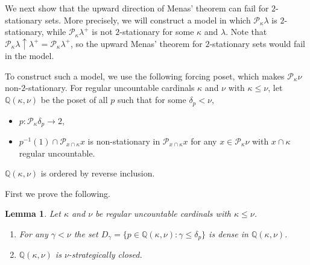 \documentclass[a4paper,12pt,reqno,oneside]{amsart}
\theoremstyle{plain}
\newtheorem{lemma}[theorem]{Lemma}
\newcommand{\mbb}{\mathbb}
\newcommand{\mcal}{\mathcal}
\begin{document}

We next show that the upward direction of Menas' theorem can fail for $2$-stationary sets. More precisely, we will construct a model in which $\mcal{P}_\kappa \lambda$ is $2$-stationary, while $\mcal{P}_\kappa \lambda^+$ is not $2$-stationary for some $\kappa$ and $\lambda$. Note that $\mcal{P}_\kappa \lambda \uparrow \lambda^+ = \mcal{P}_\kappa \lambda^+$, so the upward Menas' theorem for $2$-stationary sets would fail in the model.

To construct such a model, we use the following forcing poset, which makes $\mcal{P}_\kappa \nu$ non-$2$-stationary. For regular uncountable cardinals $\kappa$ and $\nu$ with $\kappa \leq \nu$, let $\mbb{Q} ( \kappa , \nu )$ be the poset of all $p$ such that for some $\delta_p < \nu$,
\begin{itemize}
\item[(i)] $p : \mcal{P}_\kappa \delta_p \to 2$,
\item[(ii)] $p^{-1} (1) \cap \mcal{P}_{x \cap \kappa} x$ is non-stationary in $\mcal{P}_{x \cap \kappa} x$ for any $x \in \mcal{P}_\kappa \nu$ with $x \cap \kappa$ regular uncountable.
\end{itemize}
$\mbb{Q} ( \kappa , \nu )$ is ordered by reverse inclusion.

First we prove the following.


\begin{lemma} \label{lem:Q_basics}
Let $\kappa$ and $\nu$ be regular uncountable cardinals with $\kappa \leq \nu$.
\begin{enumerate}
\item For any $\gamma < \nu$ the set $D_\gamma = \{ p \in \mbb{Q} ( \kappa , \nu ) : \gamma \leq \delta_p \}$ is dense in $\mbb{Q} ( \kappa , \nu )$.
\item $\mbb{Q} ( \kappa , \nu )$ is $\nu$-strategically closed.
\end{enumerate}
\end{lemma}
\end{document}
